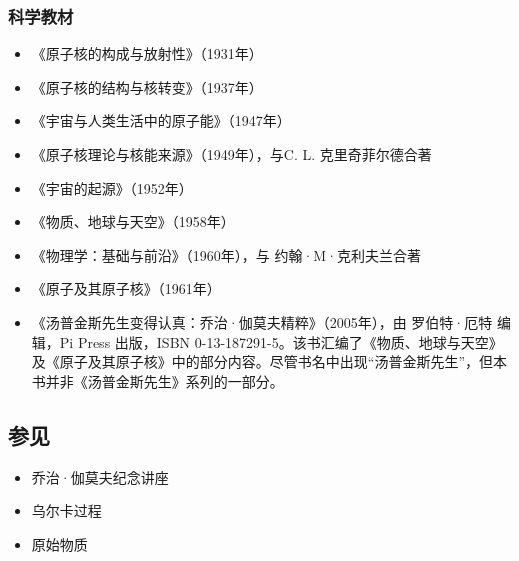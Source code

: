 \subsubsection{科学教材}
\begin{itemize}
\item 《原子核的构成与放射性》（1931年）
\item 《原子核的结构与核转变》（1937年）
\item 《宇宙与人类生活中的原子能》（1947年）
\item 《原子核理论与核能来源》（1949年），与C. L. 克里奇菲尔德合著
\item 《宇宙的起源》（1952年）
\item 《物质、地球与天空》（1958年）
\item 《物理学：基础与前沿》（1960年），与 约翰·M·克利夫兰合著
\item 《原子及其原子核》（1961年）
\item 《汤普金斯先生变得认真：乔治·伽莫夫精粹》（2005年），由 罗伯特·厄特 编辑，Pi Press 出版，ISBN 0-13-187291-5。该书汇编了《物质、地球与天空》及《原子及其原子核》中的部分内容。尽管书名中出现“汤普金斯先生”，但本书并非《汤普金斯先生》系列的一部分。
\end{itemize}
\subsection{参见}
\begin{itemize}
\item 乔治·伽莫夫纪念讲座
\item 乌尔卡过程
\item 原始物质
\end{itemize}
